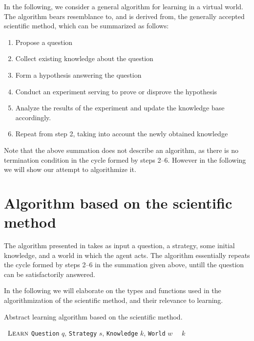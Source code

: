 \documentclass[\master/Master.tex]{subfiles}
\begin{document}
In the following, we consider a general algorithm for learning in a virtual world. The algorithm bears resemblance to, and is derived from, the generally accepted scientific method, which can be summarized as follows:

\begin{enumerate}
    \item Propose a question
    \item Collect existing knowledge about the question
    \item Form a hypothesis answering the question
    \item Conduct an experiment serving to prove or disprove the hypothesis
    \item Analyze the results of the experiment and update the knowledge base accordingly.
    \item Repeat from step 2, taking into account the newly obtained knowledge
\end{enumerate}

Note that the above summation does not describe an algorithm, as there is no termination condition in the cycle formed by steps 2--6. However in the following we will show our attempt to algorithmize it.

\section{Algorithm based on the scientific method}


The algorithm presented in  takes as input a question, a strategy, some initial knowledge, and a world in which the agent acts. The algorithm essentially repeats the cycle formed by steps 2--6 in the summation given above, untill the question can be satisfactorily answered.

In the following we will elaborate on the types and functions used in the algorithmization of the scientific method, and their relevance to learning.

\begin{algorithm}
    \caption{Abstract learning algorithm based on the scientific method.}\label{algo:science}

    \begin{algorithmic}
        \Function~{$\textsc{Learn}$} {\texttt{Question} $q$, \texttt{Strategy} $s$, \texttt{Knowledge} $k$, \texttt{World} $w$}
                \Else%
                \EndIf%
            \EndWhile%
            \State~\Return~$k$
        \EndFunction%
    \end{algorithmic}
\end{algorithm}
\end{document}
